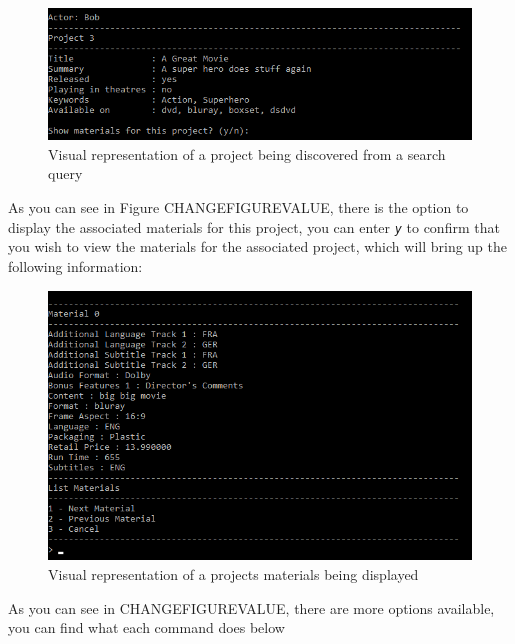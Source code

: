\documentclass[
  english,
  a4paper,
,tablecaptionabove
]{scrartcl}
\begin{document}
\begin{figure}
\centering
\includegraphics{images/user-guide/view-mode/project-search-actor.png}
\caption{Visual representation of a project being discovered from a
search query}
\end{figure}

As you can see in Figure CHANGEFIGUREVALUE, there is the option to
display the associated materials for this project, you can enter
\emph{\texttt{y}} to confirm that you wish to view the materials for the
associated project, which will bring up the following information:

\begin{figure}
\centering
\includegraphics{images/user-guide/view-mode/project-search-list-material.png}
\caption{Visual representation of a projects materials being displayed}
\end{figure}

As you can see in CHANGEFIGUREVALUE, there are more options available,
you can find what each command does below
\end{document}
